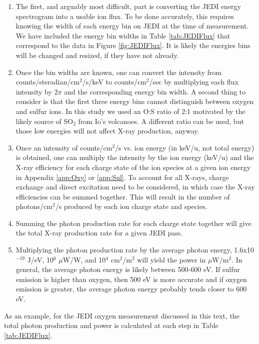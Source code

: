 \documentclass[draft]{agujournal2018}
\begin{document}
\begin{enumerate}
    \item The first, and arguably most difficult, part is converting the JEDI energy spectrogram into a usable ion flux.
    To be done accurately, this requires knowing the width of each energy bin on JEDI at the time of measurement.
    We have included the energy bin widths in Table \ref{tab:JEDIFlux} that correspond to the data in Figure \ref{fig:JEDIFlux}.
    It is likely the energies bins will be changed and resized, if they have not already.
    \item Once the bin widths are known, one can convert the intensity from counts/steradian/cm$^2$/s/keV to counts/cm$^2$/sec by multiplying each flux intensity by 2$\pi$ and the corresponding energy bin width.
    A second thing to consider is that the first three energy bins cannot distinguish between oxygen and sulfur ions.
    In this study we used an O:S ratio of 2:1 motivated by the likely source of SO$_2$ from Io's volcanoes.
    A different ratio can be used, but those low energies will not affect X-ray production, anyway.
    \item Once an intensity of counts/cm$^2$/s vs. ion energy (in keV/u, not total energy) is obtained, one can multiply the intensity by the ion energy (keV/u) and the X-ray efficiency for each charge state of the ion species at a given ion energy in Appendix \ref{app:Oxy} or \ref{app:Sul}.
    To account for all X-rays, charge exchange and direct excitation need to be considered, in which case the X-ray efficiencies can be summed together.
    This will result in the number of photons/cm$^2$/s produced by each ion charge state and species.
    \item Summing the photon production rate for each charge state together will give the total X-ray production rate  for a given JEDI pass.
    \item Multiplying the photon production rate by the average photon energy, 1.6x10$^{-19}$ J/eV, 10$^6$ $\mu$W/W, and 10$^4$ cm$^2$/m$^2$ will yield the power in $\mu$W/m$^2$.
    In general, the average photon energy is likely between 500-600 eV.
    If sulfur emission is higher than oxygen, then 500 eV is more accurate and if oxygen emission is greater, the average photon energy probably tends closer to 600 eV.
\end{enumerate}

As an example, for the JEDI oxygen measurement discussed in this text, the total photon production and power is calculated at each step in Table \ref{tab:JEDIFlux}.
\end{document}
